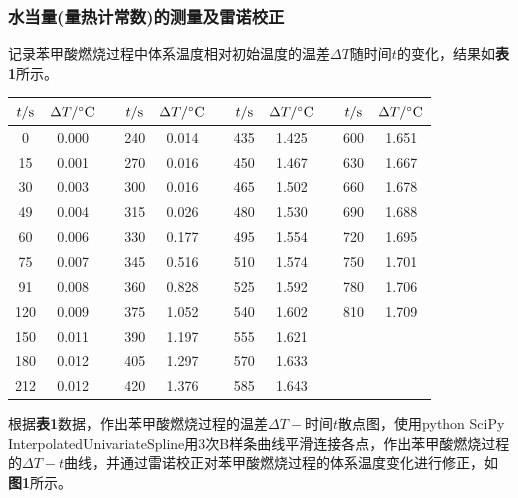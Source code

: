 \documentclass[12pt]{article}
\begin{document}
 \subsubsection{水当量(量热计常数)的测量及雷诺校正}
 记录苯甲酸燃烧过程中体系温度相对初始温度的温差$\Delta T$随时间$t$的变化，结果如\textbf{表1}所示。
\begin{table}[h]
	\centering
	\begin{tabular}{ccccccccccc}
		\toprule
		$t/{\rm s}$ & $\Delta T/{\rm ^{\circ}C}$ & & $t/{\rm s}$ & $\Delta T/{\rm ^{\circ}C}$& & 	$t/{\rm s}$ & $\Delta T/{\rm ^{\circ}C}$ & & $t/{\rm s}$ & $\Delta T/{\rm ^{\circ}C}$ \\
		\midrule
		0   & 0.000 &  & 240 & 0.014 &  & 435 & 1.425 &  & 600 & 1.651 \\
		15  & 0.001 &  & 270 & 0.016 &  & 450 & 1.467 &  & 630 & 1.667 \\
		30  & 0.003 &  & 300 & 0.016 &  & 465 & 1.502 &  & 660 & 1.678 \\
		49  & 0.004 &  & 315 & 0.026 &  & 480 & 1.530 &  & 690 & 1.688 \\
		60  & 0.006 &  & 330 & 0.177 &  & 495 & 1.554 &  & 720 & 1.695 \\
		75  & 0.007 &  & 345 & 0.516 &  & 510 & 1.574 &  & 750 & 1.701 \\
		91  & 0.008 &  & 360 & 0.828 &  & 525 & 1.592 &  & 780 & 1.706 \\
		120 & 0.009 &  & 375 & 1.052 &  & 540 & 1.602 &  & 810 & 1.709 \\
		150 & 0.011 &  & 390 & 1.197 &  & 555 & 1.621 &  &     &       \\
		180 & 0.012 &  & 405 & 1.297 &  & 570 & 1.633 &  &     &       \\
		212 & 0.012 &  & 420 & 1.376 &  & 585 & 1.643 &  &     &      \\
		\bottomrule
	\end{tabular}
\end{table}
\par
根据\textbf{表1}数据，作出苯甲酸燃烧过程的温差$\Delta T-$时间$t$散点图，使用python SciPy InterpolatedUnivariateSpline用3次B样条曲线平滑连接各点，作出苯甲酸燃烧过程的$\Delta T-t$曲线，并通过雷诺校正对苯甲酸燃烧过程的体系温度变化进行修正，如\textbf{图1}所示。
\end{document}
